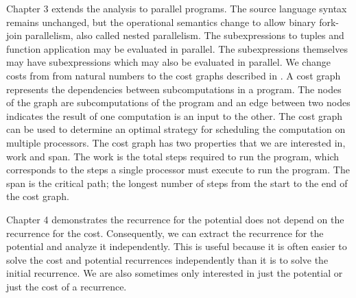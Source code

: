 Chapter 3 extends the analysis to parallel programs. The source language syntax
remains unchanged, but the operational semantics change to allow binary
fork-join parallelism, also called nested parallelism. The subexpressions to
tuples and function application may be evaluated in parallel. The
subexpressions themselves may have subexpressions which may also be evaluated
in parallel. We change costs from from natural numbers to the cost graphs
described in \citet{Harper2012PFPL}. A cost graph represents the dependencies
between subcomputations in a program.  The nodes of the graph are
subcomputations of the program and an edge between two nodes indicates the
result of one computation is an input to the other. The cost graph can be used
to determine an optimal strategy for scheduling the computation on multiple
processors. The cost graph has two properties that we are interested in, work
and span. The work is the total steps required to run the program, which
corresponds to the steps a single processor must execute to run the program.
The span is the critical path; the longest number of steps from the start to
the end of the cost graph.



Chapter 4 demonstrates the recurrence for the potential does not depend on
the recurrence for the cost. Consequently, we can extract the recurrence for the
potential and analyze it independently. This is useful because it is often
easier to solve the cost and potential recurrences independently than it is to
solve the initial recurrence. We are also sometimes only interested in just the
potential or just the cost of a recurrence.

